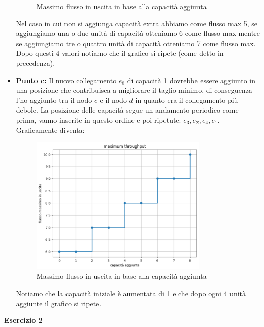 \documentclass[a4paper,12pt]{article}
\begin{document}
\begin{itemize}
\begin{figure}[h]
				\caption{Massimo flusso in uscita in base alla capacità aggiunta} %
				\label{fig:immagine} %
			\end{figure}
			\newpage
			Nel caso in cui non si aggiunga capacità extra abbiamo come flusso max 5, se aggiungiamo una o due unità di capacità otteniamo 6 come flusso max mentre se aggiungiamo tre o quattro unità di capacità otteniamo 7 come flusso max. Dopo questi 4 valori notiamo che il grafico si ripete (come detto in precedenza).
			\item \textbf{Punto c: }Il nuovo collegamento $e_8$ di capacità 1 dovrebbe essere aggiunto in una posizione che contribuisca a migliorare il taglio minimo, di conseguenza l'ho aggiunto tra il nodo $c$ e il nodo $d$ in quanto era il collegamento più debole. La posizione delle capacità segue un andamento periodico come prima, vanno inserite in questo ordine e poi ripetute: $e_3, e_2, e_4, e_1$.
			Graficamente diventa:
			\begin{figure}[h] %
				\centering %
				\includegraphics[width=0.8\textwidth]{graf2.png} %
				\caption{Massimo flusso in uscita in base alla capacità aggiunta} %
				\label{fig:immagine} %
			\end{figure}
			\newpage
			Notiamo che la capacità iniziale è aumentata di 1 e che dopo ogni 4 unità aggiunte il grafico si ripete.
	\end{itemize}
		\centering \textbf{Esercizio 2}\\
\end{document}
